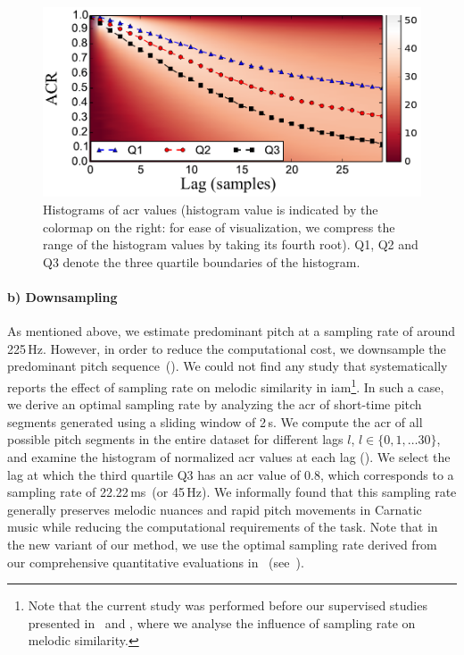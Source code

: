 \begin{figure}
	\begin{center}
		\includegraphics[width=\figSizeEightyFive]{ch06_patterns/figures/discovery/ACRHistogram.pdf}
	\end{center}
	\caption[Histograms of autocorrelation of the pitch subsequences for different lags]{Histograms of \gls{acr} values (histogram value is indicated by the colormap on the right: for ease of visualization, we compress the range of the histogram values by taking its fourth root). Q1, Q2 and Q3 denote the three quartile boundaries of the histogram. }
	\label{fig:ACRHistogram}
\end{figure}


\paragraph{b) Downsampling} 
As mentioned above, we estimate predominant pitch at a sampling rate of around 225\,Hz. However, in order to reduce the computational cost, we downsample the predominant pitch sequence~(). We could not find any study that systematically reports the effect of sampling rate on melodic similarity in \gls{iam}\footnote{Note that the current study was performed before our supervised studies presented in~ and , where we analyse the influence of sampling rate on melodic similarity.}. In such a case, we derive an optimal sampling rate by analyzing the \gls{acr} of short-time pitch segments generated using a sliding window of 2\,s. We compute the \gls{acr} of all possible pitch segments in the entire dataset for different lags $l$, $l\in \lbrace0,1,\dots30\rbrace$, and examine the histogram of normalized \gls{acr} values at each lag (). We select the lag at which the third quartile Q3 has an \gls{acr} value of 0.8, which corresponds to a sampling rate of 22.22\,ms~(or 45\,Hz). We informally found that this sampling rate generally preserves melodic nuances and rapid pitch movements in Carnatic music while reducing the computational requirements of the task. Note that in the new variant of our method, we use the optimal sampling rate derived from our comprehensive quantitative evaluations in~\cite{gulati_ICASSP2015} (see~). %


